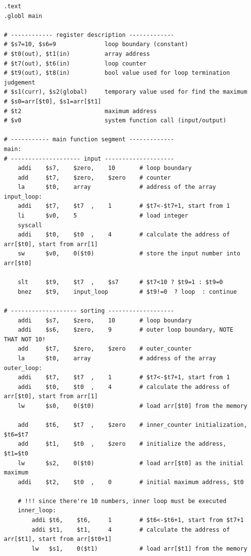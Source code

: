 \documentclass[12pt,UTF8]{ctexart}
\begin{document}
\begin{spacing}{1.1}
\begin{lstlisting}
.text
.globl main

# ------------ register description -------------
# $s7=10, $s6=9              loop boundary (constant)
# $t0(out), $t1(in)          array address
# $t7(out), $t6(in)          loop counter
# $t9(out), $t8(in)          bool value used for loop termination judgement
# $s1(curr), $s2(global)     temporary value used for find the maximum
# $s0=arr[$t0], $s1=arr[$t1]
# $t2                        maximum address
# $v0                        system function call (input/output)

# ----------- main function segment -------------
main:
# -------------------- input --------------------
    addi    $s7,    $zero,    10       # loop boundary
    add     $t7,    $zero,    $zero    # counter
    la      $t0,    array              # address of the array
input_loop:
    addi    $t7,    $t7  ,    1        # $t7<-$t7+1, start from 1
    li      $v0,    5                  # load integer
    syscall
    addi    $t0,    $t0  ,    4        # calculate the address of arr[$t0], start from arr[1]
    sw      $v0,    0($t0)             # store the input number into arr[$t0]

    slt     $t9,    $t7  ,    $s7      # $t7<10 ? $t9=1 : $t9=0
    bnez    $t9,    input_loop         # $t9!=0  ? loop  : continue

# ------------------- sorting -------------------
    addi    $s7,    $zero,    10       # loop boundary
    addi    $s6,    $zero,    9        # outer loop boundary, NOTE THAT NOT 10!
    add     $t7,    $zero,    $zero    # outer_counter
    la      $t0,    array              # address of the array
outer_loop:
    addi    $t7,    $t7  ,    1        # $t7<-$t7+1, start from 1
    addi    $t0,    $t0  ,    4        # calculate the address of arr[$t0], start from arr[1]
    lw      $s0,    0($t0)             # load arr[$t0] from the memory

    add     $t6,    $t7  ,    $zero    # inner_counter initialization, $t6=$t7
    add     $t1,    $t0  ,    $zero    # initialize the address, $t1=$t0
    lw      $s2,    0($t0)             # load arr[$t0] as the initial maximum
    addi    $t2,    $t0  ,    0        # initial maximum address, $t0

    # !!! since there're 10 numbers, inner loop must be executed 
    inner_loop:
        addi $t6,    $t6,     1        # $t6<-$t6+1, start from $t7+1
        addi $t1,    $t1,     4        # calculate the address of arr[$t1], start from arr[$t0+1]
        lw   $s1,    0($t1)            # load arr[$t1] from the memory


\end{lstlisting}
\end{spacing}
\end{document}

